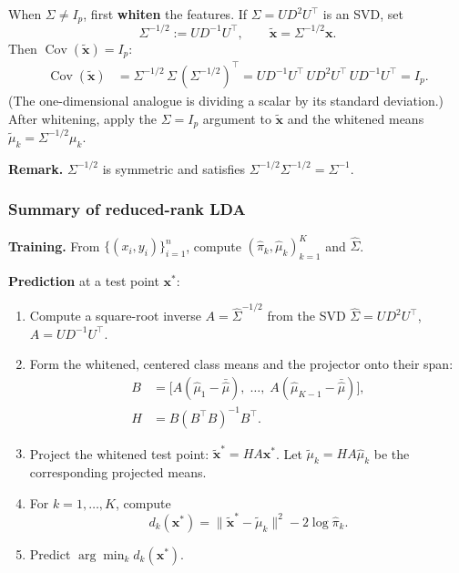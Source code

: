 \documentclass[
]{book}
\providecommand{\tightlist}{%
  \setlength{\itemsep}{0pt}\setlength{\parskip}{0pt}}
\begin{document}
When \(\Sigma \ne I_p\), first \textbf{whiten} the features. If \(\Sigma = U D^2 U^\top\) is an SVD, set
\[
\Sigma^{-1/2} := U D^{-1} U^\top, \qquad \tilde{\mathbf{x}} = \Sigma^{-1/2} \mathbf{x}.
\]
Then \(\operatorname{Cov}(\tilde{\mathbf{x}}) = I_p\):
\begin{align*}
\operatorname{Cov}(\tilde{\mathbf{x}})
&= \Sigma^{-1/2}\, \Sigma\, (\Sigma^{-1/2})^\top
= U D^{-1} U^\top \, U D^2 U^\top \, U D^{-1} U^\top
= I_p.
\end{align*}
(The one-dimensional analogue is dividing a scalar by its standard deviation.) After whitening, apply the \(\Sigma = I_p\) argument to \(\tilde{\mathbf{x}}\) and the whitened means \(\tilde{\mu}_k = \Sigma^{-1/2} \mu_k\).

\textbf{Remark.} \(\Sigma^{-1/2}\) is symmetric and satisfies \(\Sigma^{-1/2}\Sigma^{-1/2} = \Sigma^{-1}\).

\subsubsection*{Summary of reduced-rank LDA}\label{summary-of-reduced-rank-lda}

\textbf{Training.} From \(\{(x_i, y_i)\}_{i=1}^{n}\), compute \((\hat{\pi}_k, \hat{\mu}_k)_{k=1}^{K}\) and \(\hat{\Sigma}\).

\textbf{Prediction} at a test point \(\mathbf{x}^*\):

\begin{enumerate}
\def\labelenumi{\arabic{enumi}.}
\tightlist
\item
  Compute a square-root inverse \(A = \hat{\Sigma}^{-1/2}\) from the SVD \(\hat{\Sigma} = U D^2 U^\top\), \(A = U D^{-1} U^\top\).
\item
  Form the whitened, centered class means and the projector onto their span:
  \begin{align*}
  B &= \bigl[A(\hat{\mu}_1 - \bar{\hat{\mu}}),\; \ldots,\; A(\hat{\mu}_{K-1} - \bar{\hat{\mu}})\bigr], \\
  H &= B(B^\top B)^{-1} B^\top.
  \end{align*}
\item
  Project the whitened test point: \(\tilde{\mathbf{x}}^* = H A \mathbf{x}^*\). Let \(\tilde{\mu}_k = H A \hat{\mu}_k\) be the corresponding projected means.
\item
  For \(k = 1, \ldots, K\), compute
  \[
  d_k(\mathbf{x}^*) = \|\tilde{\mathbf{x}}^* - \tilde{\mu}_k\|^2 - 2\log \hat{\pi}_k.
  \]
\item
  Predict \(\arg\min_k d_k(\mathbf{x}^*)\).
\end{enumerate}
\end{document}
